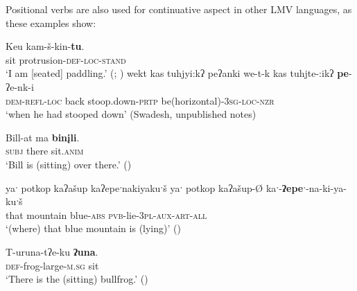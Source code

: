 \documentclass[output=paper]{LSP/langsci}
\begin{document}
Positional verbs are also used for continuative aspect in other LMV languages, as these examples show:

\ea
\settowidth{}
\gll	Keu kam-š-kin-\textbf{tu}.\\
		sit protrusion-\textsc{def-loc-stand}\\ 
\glt `I am [seated] paddling.' (\citealt[61]{GatschetSwanton1932}; \citealt[27]{Watkins1976})\footnotemark
\z
{}
\ea	
\settowidth{}
wekt kas tuhjyi:kʔ peʔanki 
\gll		we-t-k 	 kas 	 tuhjte-:ikʔ 	 \textbf{pe}-ʔe-nk-i\\
		\textsc{dem-refl-loc} back	  stoop.down-\textsc{prtp} be(horizontal)-\textsc{3sg-loc-nzr}\\
\glt	`when he had stooped down' (Swadesh, unpublished notes)
\z

\ea
\settowidth{}
\gll	Bill-at ma \textbf{binįli}.\\
	 \textsc{subj} there sit.\textsc{anim}\\ 
\glt `Bill is (sitting) over there.' (\citealt[21]{Watkins1976})
\z
		
\ea	
\settowidth{} 
yaˑ potkop kaʔašup kaʔepeˑnakiyakuˑš 
\gll		yaˑ potkop kaʔašup-Ø kaˑ-\textbf{ʔepeˑ}-na-ki-ya-kuˑš\\
		that mountain blue-\textsc{abs} \textsc{pvb}-lie-\textsc{3pl-aux-art-all}\\
\glt	`(where) that blue mountain is (lying)' (\citealt[438]{Kimball2005})
\z

\ea
\settowidth{}
\gll	T-uruna-tʔe-ku 	\textbf{ʔuna}.\\
 \textsc{def}-frog-large-\textsc{m.sg} sit\\ 
\glt `There is the (sitting) bullfrog.' (\citealt[26]{Watkins1976})
\z
\end{document}
